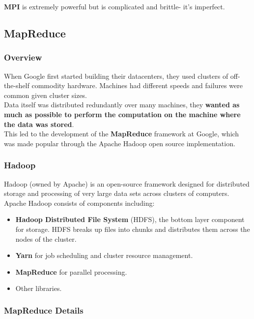 \documentclass[english, 10pt]{article}
\begin{document}
\textbf{MPI} is extremely powerful but is complicated and brittle- it's imperfect.

\subsection{MapReduce}

\subsubsection{Overview}

When Google first started building their datacenters, they used clusters of off-the-shelf commodity hardware. Machines had different speeds and failures were common given cluster sizes.\\

Data itself was distributed redundantly over many machines, they \textbf{wanted as much as possible to perform the computation on the machine where the data was stored}.\\

This led to the development of the \textbf{MapReduce} framework at Google, which was made popular through the Apache Hadoop open source implementation.\\

\subsubsection{Hadoop}

\begin{myproof}
Hadoop (owned by Apache) is an open-source framework designed for distributed storage and processing of very large data sets across clusters of computers. Apache Hadoop consists of components including:

\begin{itemize}
	\item \textbf{Hadoop Distributed File System} (HDFS), the bottom layer component for storage. HDFS breaks up files into chunks and distributes them across the nodes of the cluster.
	\item \textbf{Yarn} for job scheduling and cluster resource management.
	\item \textbf{MapReduce} for parallel processing.
	\item Other libraries.
\end{itemize}

\end{myproof}


\subsubsection{MapReduce Details}
\end{document}
